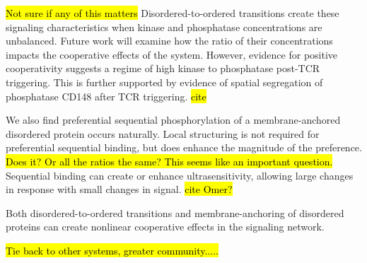 \documentclass[../../AdvancementSummary.tex]{subfiles}
\begin{document}
\hl{Not sure if any of this matters}
Disordered-to-ordered transitions create these signaling characteristics when kinase and phosphatase concentrations are unbalanced. Future work will examine how the ratio of their concentrations impacts the cooperative effects of the system. However, evidence for positive cooperativity suggests a regime of high kinase to phosphatase post-TCR triggering. This is further supported by evidence of spatial segregation of phosphatase CD148 after TCR triggering. \hl{cite} 

We also find preferential sequential phosphorylation of a membrane-anchored disordered protein occurs naturally. Local structuring is not required for preferential sequential binding, but does enhance the magnitude of the preference. \hl{Does it? Or all the ratios the same?  This seems like an important question.} Sequential binding can create or enhance ultrasensitivity, allowing large changes in response with small changes in signal. \hl{cite Omer?}

Both disordered-to-ordered transitions and membrane-anchoring of disordered proteins can create nonlinear cooperative effects in the signaling network. 

\hl{Tie back to other systems, greater community.....} 


\end{document}
